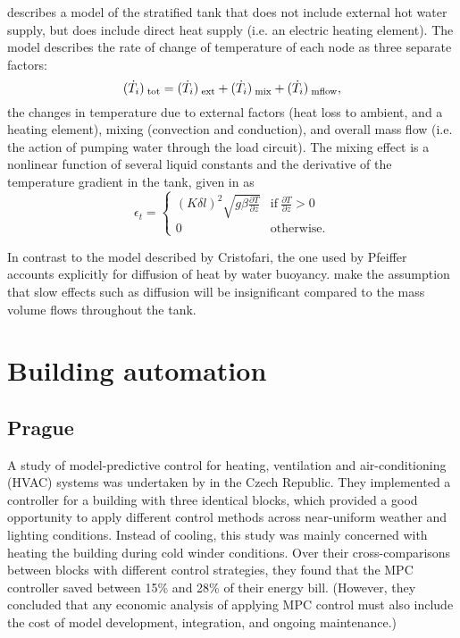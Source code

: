 \textcite{Pfeiffer11} describes a model of the stratified tank that does not include external hot water supply, but does include direct heat supply (i.e. an electric heating element).
The model describes the rate of change of temperature of each node as three separate factors:
$$ (\dot{T}_{i})_{\;\text{tot}} = (\dot{T}_{i})_{\;\text{ext}} + (\dot{T}_{i})_{\;\text{mix}} + (\dot{T}_{i})_{\;\text{mflow}}, $$
the changes in temperature due to external factors (heat loss to ambient, and a heating element), mixing (convection and conduction), and overall mass flow (i.e. the action of pumping water through the load circuit).
The mixing effect is a nonlinear function of several liquid constants and the derivative of the temperature gradient in the tank, given in \textcite{Hawlader88} as
$$ \epsilon_t = \left\{ \begin{array}{ll}
   (K \delta l)^2 \sqrt{g \beta \frac{\partial T}{\partial z}} & \text{if}\ \frac{\partial T}{\partial z} > 0 \\
   0 & \text{otherwise}.
\end{array} \right. $$

In contrast to the model described by Cristofari, the one used by Pfeiffer accounts explicitly for diffusion of heat by water buoyancy.
 make the assumption that slow effects such as diffusion will be insignificant compared to the mass volume flows throughout the tank.

\section{Building automation}

\subsection{Prague}

A study of model-predictive control for heating, ventilation and air-conditioning (HVAC) systems was undertaken by \textcite{Siroky11} in the Czech Republic.
They implemented a controller for a building with three identical blocks, which provided a good opportunity to apply different control methods across near-uniform weather and lighting conditions.
Instead of cooling, this study was mainly concerned with heating the building during cold winder conditions.
Over their cross-comparisons between blocks with different control strategies, they found that the MPC controller saved between 15\% and 28\% of their energy bill.
(However, they concluded that any economic analysis of applying MPC control must also include the cost of model development, integration, and ongoing maintenance.)

